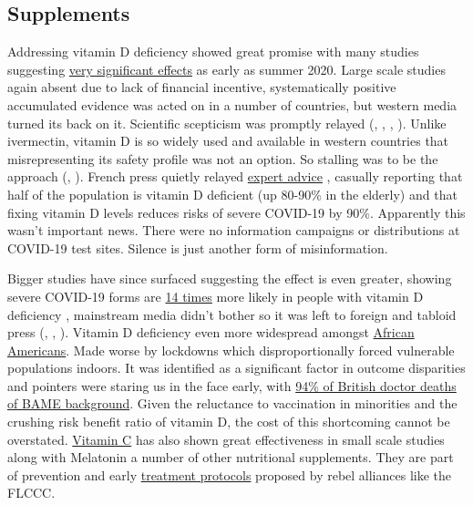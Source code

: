 \documentclass[11pt,a4paper,notitlepage]{report}
\begin{document}
\subsection*{Supplements}

Addressing vitamin D deficiency showed great promise with many studies suggesting \href{https://c19vitamind.com/}{very significant effects} as early as summer 2020. Large scale studies again absent due to lack of financial incentive, systematically positive accumulated evidence was acted on in a number of countries, but western media turned its back on it. Scientific scepticism was promptly relayed (\cite{guardian29062020}, \cite{guardian29032021}, \cite{bbc17112020}, \cite{quechoisir29012021}). Unlike ivermectin, vitamin D is so widely used and available in western countries that misrepresenting its safety profile was not an option. So stalling was to be the approach (\cite{bbc05042021}, \cite{guardian29022021}). French press quietly relayed \href{https://www.franceinter.fr/covid-19-73-experts-lancent-un-appel-pour-qu-on-donne-de-la-vitamine-d-a-la-population-francaise}{expert advice} \cite{franceinter19012021}, casually reporting that half of the population is vitamin D deficient (up 80-90\% in the elderly) and that fixing vitamin D levels reduces risks of severe COVID-19 by 90\%. Apparently this wasn't important news. There were no information campaigns or distributions at COVID-19 test sites. Silence is just another form of misinformation.

Bigger studies have since surfaced suggesting the effect is even greater, showing severe COVID-19 forms are \href{https://journals.plos.org/plosone/article?id=10.1371/journal.pone.0263069}{14 times} more likely in people with vitamin D deficiency \cite{10.1371/journal.pone.0263069}, mainstream media didn't bother so it was left to foreign and tabloid press (\cite{timesofisrael03022022}, \cite{dailymail08022022}, \cite{hindustantimes14022022}). Vitamin D deficiency even more widespread amongst \href{https://www.everydayhealth.com/vitamin-d/does-vitamin-d-deficiency-pose-a-special-risk-for-black-people}{African Americans}. Made worse by lockdowns which disproportionally forced vulnerable populations indoors. It was identified as a significant factor in outcome disparities \cite{Ames2021-sf} and pointers were staring us in the face early, with \href{https://twitter.com/TheBMA/status/1271768163630428160?s=20}{94\% of British doctor deaths of BAME background}. Given the reluctance to vaccination in minorities and the crushing risk benefit ratio of vitamin D, the cost of this shortcoming cannot be overstated. \href{https://nutritionj.biomedcentral.com/articles/10.1186/s12937-021-00727-z}{Vitamin C} has also shown great effectiveness in small scale studies \cite{irriguible2021} along with Melatonin \cite{Cross2021-bl} a number of other nutritional supplements. They are part of prevention and early \href{https://covid19criticalcare.com/wp-content/uploads/2020/11/FLCCC-Alliance-I-MASKplus-Protocol-ENGLISH.pdf}{treatment protocols} \cite{flccc-imask} proposed by rebel alliances like the FLCCC.
\end{document}
